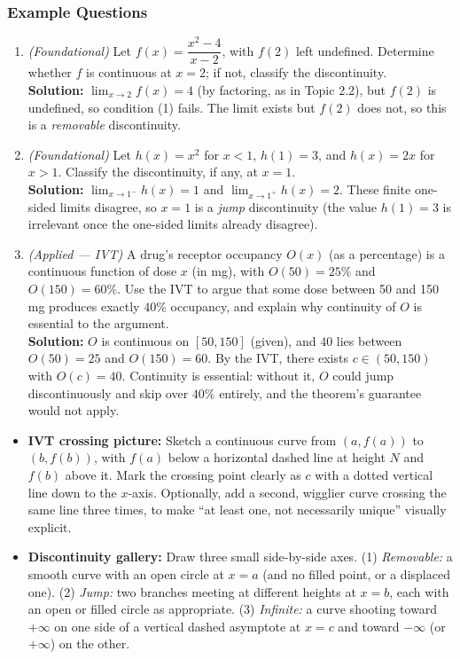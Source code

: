 \documentclass[11pt]{article}
\begin{document}
\subsubsection*{Example Questions}
\begin{enumerate}[leftmargin=*]
  \item \textit{(Foundational)} Let $f(x)=\dfrac{x^2-4}{x-2}$, with $f(2)$ left undefined. Determine whether $f$ is continuous at $x=2$; if not, classify the discontinuity. \\
  \textbf{Solution:} $\displaystyle\lim_{x\to 2}f(x)=4$ (by factoring, as in Topic 2.2), but $f(2)$ is undefined, so condition (1) fails. The limit exists but $f(2)$ does not, so this is a \emph{removable} discontinuity.

  \item \textit{(Foundational)} Let $h(x)=x^2$ for $x<1$, $h(1)=3$, and $h(x)=2x$ for $x>1$. Classify the discontinuity, if any, at $x=1$. \\
  \textbf{Solution:} $\displaystyle\lim_{x\to 1^-}h(x)=1$ and $\displaystyle\lim_{x\to 1^+}h(x)=2$. These finite one-sided limits disagree, so $x=1$ is a \emph{jump} discontinuity (the value $h(1)=3$ is irrelevant once the one-sided limits already disagree).

  \item \textit{(Applied --- IVT)} A drug's receptor occupancy $O(x)$ (as a percentage) is a continuous function of dose $x$ (in mg), with $O(50)=25\%$ and $O(150)=60\%$. Use the IVT to argue that some dose between 50 and 150 mg produces exactly $40\%$ occupancy, and explain why continuity of $O$ is essential to the argument. \\
  \textbf{Solution:} $O$ is continuous on $[50,150]$ (given), and $40$ lies between $O(50)=25$ and $O(150)=60$. By the IVT, there exists $c\in(50,150)$ with $O(c)=40$. Continuity is essential: without it, $O$ could jump discontinuously and skip over $40\%$ entirely, and the theorem's guarantee would not apply.
\end{enumerate}

\begin{instructorbox}
\begin{itemize}[leftmargin=*]
  \item \textbf{IVT crossing picture:} Sketch a continuous curve from $(a,f(a))$ to $(b,f(b))$, with $f(a)$ below a horizontal dashed line at height $N$ and $f(b)$ above it. Mark the crossing point clearly as $c$ with a dotted vertical line down to the $x$-axis. Optionally, add a second, wigglier curve crossing the same line three times, to make ``at least one, not necessarily unique'' visually explicit.
  \item \textbf{Discontinuity gallery:} Draw three small side-by-side axes. (1) \emph{Removable:} a smooth curve with an open circle at $x=a$ (and no filled point, or a displaced one). (2) \emph{Jump:} two branches meeting at different heights at $x=b$, each with an open or filled circle as appropriate. (3) \emph{Infinite:} a curve shooting toward $+\infty$ on one side of a vertical dashed asymptote at $x=c$ and toward $-\infty$ (or $+\infty$) on the other.
\end{itemize}
\end{instructorbox}
\end{document}
